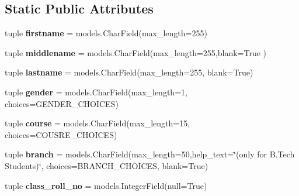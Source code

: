 \subsection*{Static Public Attributes}
\begin{DoxyCompactItemize}
\item 
\hypertarget{classsouvenir_1_1student_1_1models_1_1Profile_a39e76d5aa4b2709162e8c254e5f6801b}{tuple {\bfseries firstname} = models.\-Char\-Field(max\-\_\-length=255)}\label{classsouvenir_1_1student_1_1models_1_1Profile_a39e76d5aa4b2709162e8c254e5f6801b}

\item 
\hypertarget{classsouvenir_1_1student_1_1models_1_1Profile_adca2f69a7534f6f48c1c1977db9c31d2}{tuple {\bfseries middlename} = models.\-Char\-Field(max\-\_\-length=255,blank=True )}\label{classsouvenir_1_1student_1_1models_1_1Profile_adca2f69a7534f6f48c1c1977db9c31d2}

\item 
\hypertarget{classsouvenir_1_1student_1_1models_1_1Profile_af29345b14b2f7043189e29cd15c560cd}{tuple {\bfseries lastname} = models.\-Char\-Field(max\-\_\-length=255, blank=True)}\label{classsouvenir_1_1student_1_1models_1_1Profile_af29345b14b2f7043189e29cd15c560cd}

\item 
\hypertarget{classsouvenir_1_1student_1_1models_1_1Profile_a8e5e8b84363bc6e2d81c32c39d6e3119}{tuple {\bfseries gender} = models.\-Char\-Field(max\-\_\-length=1, choices=G\-E\-N\-D\-E\-R\-\_\-\-C\-H\-O\-I\-C\-E\-S)}\label{classsouvenir_1_1student_1_1models_1_1Profile_a8e5e8b84363bc6e2d81c32c39d6e3119}

\item 
\hypertarget{classsouvenir_1_1student_1_1models_1_1Profile_a4d3e68863b165fc57f89caf4a7a55d44}{tuple {\bfseries course} = models.\-Char\-Field(max\-\_\-length=15, choices=C\-O\-U\-S\-R\-E\-\_\-\-C\-H\-O\-I\-C\-E\-S)}\label{classsouvenir_1_1student_1_1models_1_1Profile_a4d3e68863b165fc57f89caf4a7a55d44}

\item 
\hypertarget{classsouvenir_1_1student_1_1models_1_1Profile_a9ccf435a095d263b72e565d30c9d7460}{tuple {\bfseries branch} = models.\-Char\-Field(max\-\_\-length=50,help\-\_\-text=\char`\"{}(only for B.\-Tech Students)\char`\"{}, choices=B\-R\-A\-N\-C\-H\-\_\-\-C\-H\-O\-I\-C\-E\-S, blank=True)}\label{classsouvenir_1_1student_1_1models_1_1Profile_a9ccf435a095d263b72e565d30c9d7460}

\item 
\hypertarget{classsouvenir_1_1student_1_1models_1_1Profile_a8cd7827aa9184688add7b23670f65486}{tuple {\bfseries class\-\_\-roll\-\_\-no} = models.\-Integer\-Field(null=True)}\label{classsouvenir_1_1student_1_1models_1_1Profile_a8cd7827aa9184688add7b23670f65486}


\end{DoxyCompactItemize}
